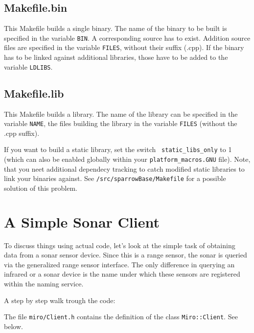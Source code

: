 \subsection{Makefile.bin}

This Makefile builds a single binary. The name of the binary to be
built is specified in the variable {\tt BIN}. A corresponding
source has to exist. Addition source files are specified in the
variable {\tt FILES}, without their suffix (.cpp). If the binary has
to be linked against additional libraries, those have to be added to the
variable {\tt LDLIBS}.


\subsection{Makefile.lib}

This Makefile builds a library. The name of the library can be
specified in the variable {\tt NAME}, the files building the
library in the variable {\tt FILES} (without the .cpp suffix).

If you want to build a static library, set the switch {\tt
  static\_libs\_only} to 1 (which can also be enabled globally within
your \texttt{platform\_macros.GNU} file). Note, that you neet
additional dependecy tracking to catch modified static libraries to
link your binaries against. See \texttt{/src/sparrowBase/Makefile} for
a possible solution of this problem.

\section{A Simple Sonar Client}

To discuss things using actual code, let's look at the simple task of
obtaining data from a sonar sensor device. Since this is a range
sensor, the sonar is queried via the generalized range sensor
interface. The only difference in querying an infrared or a sonar
device is the name under which these sensors are registered within the
naming service.


\label{lst:SonarPoll1}

A step by step walk trough the code:



The file \lstinline!miro/Client.h! contains the definition of the class
\lstinline!Miro::Client!. See below.



